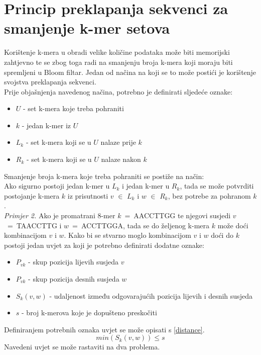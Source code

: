 \documentclass[times, utf8, seminar, numeric]{fer}
\begin{document}
\chapter{Princip preklapanja sekvenci za smanjenje k-mer setova}
Korištenje k-mera u obradi velike količine podataka može biti memorijski zahtjevno
te se zbog toga radi na smanjenju broja k-mera koji moraju biti spremljeni u
Bloom filtar. Jedan od načina na koji se to može postići je korištenje svojstva
preklapanja sekvenci.\\
Prije objašnjenja navedenog načina, potrebno je definirati sljedeće oznake:
\begin{itemize}
  \item{{$U$} - set k-mera koje treba pohraniti}
  \item{{$k$} - jedan k-mer iz {$U$}}
  \item{{$L_k$} - set k-mera koji se u {$U$} nalaze prije {$k$}}
  \item{{$R_k$} - set k-mera koji se u {$U$} nalaze nakon {$k$}}
\end{itemize}
Smanjenje broja k-mera koje treba pohraniti se postiže na način:\\
Ako sigurno postoji jedan k-mer u {$L_k$} i jedan k-mer u {$R_k$}, tada se može
potvrditi postojanje k-mera {$k$} iz prisutnosti {$v$} {$\in$} {$L_k$} i
{$w$} {$\in$} {$R_k$}, bez potrebe za pohranom {$k$}.\\
\textit{Primjer 2.} Ako je promatrani 8-mer {$k$}~=~AACCTTGG te njegovi susjedi
{$v$}~=~TAACCTTG i {$w$}~=~ACCTTGGA, tada se do željenog k-mera {$k$} može doći
kombinacijom {$v$} i {$w$}.
Kako bi se stvarno moglo kombinacijom {$v$} i {$w$} doći do {$k$} postoji jedan
uvjet za koji je potrebno definirati dodatne oznake:
\begin{itemize}
  \item{{$P_{vk}$} - skup pozicija lijevih susjeda {$v$}}
  \item{{$P_{vk}$} - skup pozicija desnih susjeda {$w$}}
  \item{{$S_{k}(v,w)$} - udaljenost između odgovarajućih pozicija lijevih i
    desnih susjeda}
  \item{{$s$} - broj k-merova koje je dopušteno preskočiti}
\end{itemize}
Definiranjem potrebnih oznaka uvjet se može opisati s \ref{distance}.
\begin{equation}
  \label{distance}
  min(S_k(v,w)) \leq s
\end{equation}
Navedeni uvjet se može rastaviti na dva problema.\\
\end{document}
